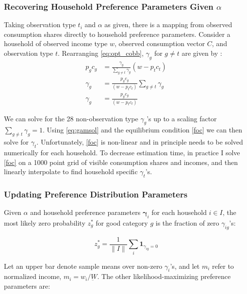 \documentclass[12pt]{article}
\begin{document}
\subsubsection{Recovering Household Preference Parameters Given $\alpha$}
\label{sec:upd_prefs}

Taking observation type $t_i$ and $\alpha$ as given, there is a mapping from observed consumption shares directly to household preference parameters.  Consider a household of observed income type $w$, observed consumption vector $C$, and observation type $t$.  Rearranging \eqref{eq:opt_cobb}, $\gamma_g$ for $g\neq t$ are given by :
\begin{align}
	p_gc_g &= \frac{\gamma_g}{\sum_{g\neq t}\gamma_g}  \left(w-  p_t c_t\right) \nonumber \\
	\gamma_g &= \frac{p_g c_g}{\left(w- p_t c_t\right)} \sum_{g\neq t}\gamma_g \nonumber \\
	\label{eq:gamsol}
	\gamma_g &= \frac{p_g c_g}{\left(w- p_t c_t\right)} 
\end{align}

We can solve for the 28 non-observation type $\gamma_g$'s up to a scaling factor $\sum_{g\neq t}\gamma_g = 1$.  Using \eqref{eq:gamsol} and the equilibrium condition \eqref{foc} we can then solve for $\gamma_t$.  Unfortunately, \eqref{foc} is non-linear and in principle needs to be solved numerically for each household.  To decrease estimation time, in practice I solve \eqref{foc} on a 1000 point grid of visible consumption shares and incomes, and then linearly interpolate to find household specific $\gamma_t$'s.

\subsubsection{Updating Preference Distribution Parameters}

Given $\alpha$ and household preference parameters $\boldsymbol{\gamma}_i$ for each household $i \in I$, the most likely zero probability $z_g^*$ for good category $g$ is the fraction of zero $\gamma_{ig}$'s:

\begin{equation}
    z_g^* = \frac{1}{\|I\|} \sum_{i} \mathbf{1}_{\gamma_{ig} = 0} \nonumber
\end{equation}

Let an upper bar denote sample means over non-zero $\gamma_i$'s, and let $m_i$ refer to normalized income, $m_i = w_i/\underbar{W}$.  The other likelihood-maximizing preference parameters are:
\end{document}

